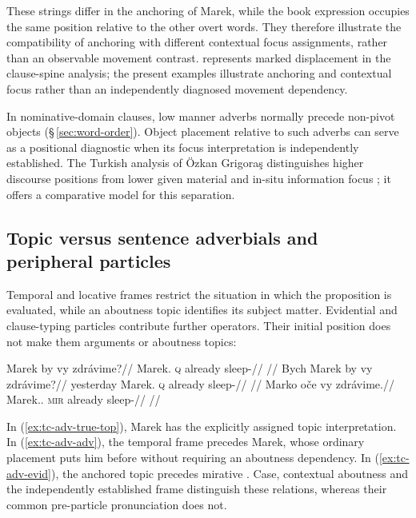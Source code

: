 \noindent These strings differ in the anchoring of Marek, while the book
 expression occupies the same position relative to the other overt words.
 They therefore illustrate the compatibility of anchoring with different
 contextual focus assignments, rather than an observable movement contrast.
  represents marked displacement in the clause-spine analysis;
 the present examples illustrate anchoring and contextual focus rather than
 an independently diagnosed movement dependency.

In nominative-domain clauses, low manner adverbs normally precede
 non-pivot objects (§\,\ref{sec:word-order}).
 Object placement relative to such adverbs can serve as a positional
 diagnostic when its focus interpretation is independently established.
 The Turkish analysis of Özkan Grigoraş distinguishes higher discourse
 positions from lower given material and in-situ information focus
 \cite[§\,4.4.2]{ozkangrigoras2020}; it offers a comparative model for this separation.

\subsection{Topic versus sentence adverbials and peripheral particles}
\label{sec:tc-adverbials}

Temporal and locative frames restrict the situation in which the proposition
 is evaluated, while an aboutness topic identifies its subject matter.
 Evidential and clause-typing particles contribute further operators. Their
 initial position does not make them arguments or aboutness topics:

\pex\label{ex:tc-adv-contrast}
\a\label{ex:tc-adv-true-top}%
\begingl
\gla Marek by vy zdrávime?//
\glb Marek.\Dir{} \textsc{q} already sleep-\Prog{}//
\glft {}
      //
\endgl
\a\label{ex:tc-adv-adv}%
\begingl
\gla Bych Marek by vy zdrávime?//
\glb yesterday Marek.\Dir{} \textsc{q} already sleep-\Prog{}//
\glft {}
      //
\endgl
\a\label{ex:tc-adv-evid}%
\begingl
\gla Marko oče vy zdrávime.//
\glb Marek.\Dir{}.\Def{} \textsc{mir} already sleep-\Prog{}//
\glft {}
      //
\endgl
\xe

\noindent In (\ref{ex:tc-adv-true-top}), Marek has the explicitly assigned
 topic interpretation. In (\ref{ex:tc-adv-adv}), the temporal frame precedes
 Marek, whose ordinary placement puts him before  without requiring
 an aboutness dependency. In (\ref{ex:tc-adv-evid}), the anchored topic
 precedes mirative . Case, contextual aboutness and the independently
 established frame distinguish these relations, whereas their common
 pre-particle pronunciation does not.

